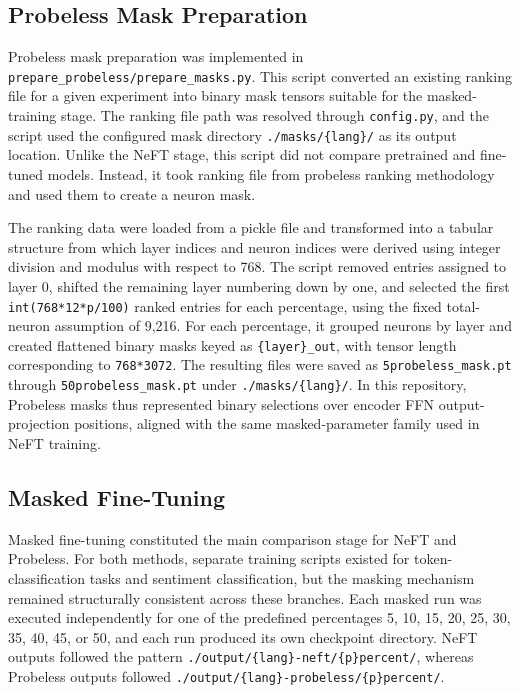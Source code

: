 \documentclass[12pt]{article}
\begin{document}
\subsection{Probeless Mask Preparation}

Probeless mask preparation was implemented in \texttt{prepare\_probeless/prepare\_masks.py}. This script converted an existing ranking file for a given experiment into binary mask tensors suitable for the masked-training stage. The ranking file path was resolved through \texttt{config.py}, and the script used the configured mask directory \texttt{./masks/\{lang\}/} as its output location. Unlike the NeFT stage, this script did not compare pretrained and fine-tuned models. Instead, it took ranking file from probeless ranking methodology and used them to create a neuron mask.

The ranking data were loaded from a pickle file and transformed into a tabular structure from which layer indices and neuron indices were derived using integer division and modulus with respect to 768. The script removed entries assigned to layer 0, shifted the remaining layer numbering down by one, and selected the first \texttt{int(768*12*p/100)} ranked entries for each percentage, using the fixed total-neuron assumption of 9,216. For each percentage, it grouped neurons by layer and created flattened binary masks keyed as \texttt{\{layer\}\_out}, with tensor length corresponding to \texttt{768*3072}. The resulting files were saved as \texttt{5probeless\_mask.pt} through \texttt{50probeless\_mask.pt} under \texttt{./masks/\{lang\}/}. In this repository, Probeless masks thus represented binary selections over encoder FFN output-projection positions, aligned with the same masked-parameter family used in NeFT training.

\subsection{Masked Fine-Tuning}

Masked fine-tuning constituted the main comparison stage for NeFT and Probeless. For both methods, separate training scripts existed for token-classification tasks and sentiment classification, but the masking mechanism remained structurally consistent across these branches. Each masked run was executed independently for one of the predefined percentages 5, 10, 15, 20, 25, 30, 35, 40, 45, or 50, and each run produced its own checkpoint directory. NeFT outputs followed the pattern \texttt{./output/\{lang\}-neft/\{p\}percent/}, whereas Probeless outputs followed \texttt{./output/\{lang\}-probeless/\{p\}percent/}.
\end{document}
